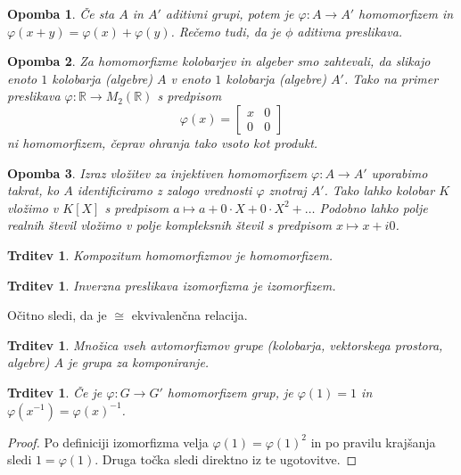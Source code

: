 \documentclass[10pt, a4paper]{article}
\newtheorem{trditev}[izr]{Trditev}
\newtheorem*{opomba}{Opomba}
\newenvironment{noticeC}{%
  \tcolorbox[%
  notitle,
  empty,
  enhanced,  %
  breakable,
  coltext=black, 
  fontupper=\rmfamily,
  parbox=false,
  noparskip,
  sharp corners,
  boxrule=-1pt,  %
  frame hidden,
  left=7pt,  %
  right=7pt,
  top=5pt,
  bottom=5pt,
  before skip=2.5ex plus 2pt,
  after skip=2.5ex plus 2pt,
  overlay unbroken and last={%
  },
  ]}
{\endtcolorbox}
\newenvironment{dokaz}%
  {\begin{noticeC}\begin{proof}}%
  {\end{proof}\end{noticeC}}
\newcommand{\R}{\mathbb {R}}
\begin{document}
\begin{opomba}
  Če sta $A$ in $A'$ aditivni grupi, potem je $\varphi: A \to A'$ homomorfizem in $\varphi(x + y) = \varphi(x) + \varphi(y)$.
  Rečemo tudi, da je $\phi$ aditivna preslikava.
\end{opomba}

\begin{opomba}
  Za homomorfizme kolobarjev in algeber smo zahtevali, da slikajo enoto $1$ kolobarja (algebre) $A$ 
  v enoto $1$ kolobarja (algebre) $A'$. Tako na primer preslikava $\varphi: \R \to M_2 (\R)$ s predpisom 
  $$\varphi(x) = \begin{bmatrix}
    x & 0\\
    0 & 0
  \end{bmatrix}$$ ni homomorfizem, čeprav ohranja tako vsoto kot produkt.
\end{opomba}

\begin{opomba}
  Izraz vložitev za injektiven homomorfizem $\varphi: A \to A'$ uporabimo takrat, 
  ko $A$ identificiramo z zalogo vrednosti $\varphi$ znotraj $A'$.
  Tako lahko kolobar $K$ vložimo v $K[X]$ s predpisom $a \mapsto a + 0\cdot X + 0 \cdot X^2 + \dots$
  Podobno lahko polje realnih števil vložimo v polje kompleksnih števil s predpisom $x \mapsto x + i0$.
\end{opomba}

\begin{trditev}
  Kompozitum homomorfizmov je homomorfizem.
\end{trditev}

\begin{trditev}
  Inverzna preslikava izomorfizma je izomorfizem.
\end{trditev}

Očitno sledi, da je $\cong$ ekvivalenčna relacija.

\begin{trditev}
  Množica vseh avtomorfizmov grupe (kolobarja, vektorskega prostora, algebre) $A$ je grupa za komponiranje.
\end{trditev}

\begin{trditev}
  Če je $\varphi: G \to G'$ homomorfizem grup, je $\varphi(1) = 1$ in $\varphi(x^{-1}) = \varphi(x)^{-1}$.
\end{trditev}

\begin{dokaz}
  Po definiciji izomorfizma velja $\varphi(1) = \varphi(1)^2$ in po pravilu krajšanja sledi $1 = \varphi(1)$.
  Druga točka sledi direktno iz te ugotovitve.
\end{dokaz}
\end{document}
